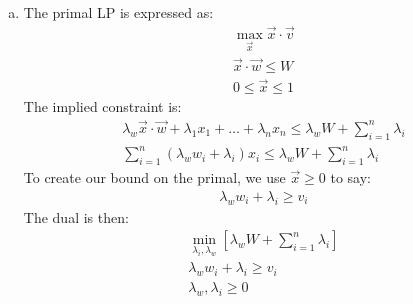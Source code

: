 \documentclass[10pt]{article}
\begin{document}
\begin{solution}
\begin{enumerate}[(a)]
{\begin{algorithm}[H]
\begin{algorithmic}[1]
            \end{algorithmic}
        \end{algorithm}
    }
    \item {
        The primal LP is expressed as:
        \begin{align*}
            \max_{\vec{x}} \vec{x} \cdot \vec{v} \\
            \vec{x} \cdot \vec{w} \leq W \\
            0 \leq \vec{x} \leq 1
        \end{align*}
        The implied constraint is:
        \begin{align*}
            \lambda_w \vec{x} \cdot \vec{w} + \lambda_1 x_1 + \dots + \lambda_n x_n \leq \lambda_w W + \sum_{i=1}^n \lambda_i \\
            \sum_{i=1}^n (\lambda_w w_i + \lambda_i)x_i \leq \lambda_w W + \sum_{i=1}^n \lambda_i
        \end{align*}
        To create our bound on the primal, we use $\vec{x} \geq 0$ to say:
        \begin{align*}
            \lambda_w w_i + \lambda_i \geq v_i
        \end{align*}
        The dual is then:
        \begin{align*}
            \min_{\lambda_i, \lambda_w} [\lambda_w W + \sum_{i=1}^n \lambda_i] \\
            \lambda_w w_i + \lambda_i \geq v_i \\
            \lambda_w, \lambda_i \geq 0
        \end{align*}

    }

\end{enumerate}

\end{solution}

\newpage
\end{document}
